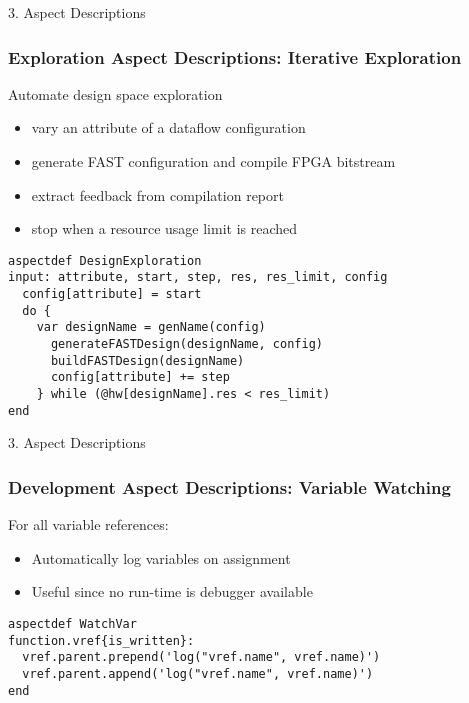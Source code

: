 \begin{frame}[fragile]{3. Aspect Descriptions}
  \frametitle{Exploration Aspect Descriptions: Iterative Exploration}
  Automate design space exploration
  \begin{itemize}
  \item vary an attribute of a dataflow configuration
  \item generate FAST configuration and compile FPGA bitstream
  \item extract feedback from compilation report
  \item stop when a resource usage limit is reached
  \end{itemize}
  \begin{lstlisting}[label=lst:label, style=lara]
aspectdef DesignExploration
input: attribute, start, step, res, res_limit, config
  config[attribute] = start
  do {
    var designName = genName(config)
      generateFASTDesign(designName, config)
      buildFASTDesign(designName)
      config[attribute] += step
    } while (@hw[designName].res < res_limit)
end
  \end{lstlisting}
\end{frame}

\begin{frame}[fragile]{3. Aspect Descriptions}
  \frametitle{Development Aspect Descriptions: Variable Watching}
  For all variable references:
  \begin{itemize}
  \item Automatically log variables on assignment
  \item Useful since no run-time is debugger available
  \end{itemize}
  \begin{lstlisting}[label=lst:label, style=lara]
aspectdef WatchVar
function.vref{is_written}:
  vref.parent.prepend('log("vref.name", vref.name)')
  vref.parent.append('log("vref.name", vref.name)')
end
  \end{lstlisting}
\end{frame}
